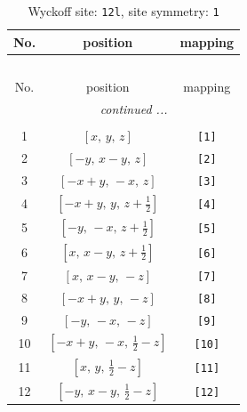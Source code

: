 \documentclass[fleqn,8pt]{jsarticle}
\begin{document}
\begin{longtable}{ccc}
\caption{Wyckoff site: {\tt 12l}, site symmetry: {\tt 1}}
 \\
 \hline \hline
No. & position & mapping \\ \hline \endfirsthead

\multicolumn{2}{l}{\tablename\ \thetable{}} \\
 \hline \hline
No. & position & mapping \\ \hline \endhead

 \hline \hline
\multicolumn{2}{r}{\footnotesize\it continued ...} \\ \endfoot

 \hline \hline
\multicolumn{2}{r}{} \\ \endlastfoot

1 & $\left[ x,\, y,\, z \right]$ & {\tt [1]} \\ \hline
2 & $\left[ - y,\, x - y,\, z \right]$ & {\tt [2]} \\ \hline
3 & $\left[ - x + y,\, - x,\, z \right]$ & {\tt [3]} \\ \hline
4 & $\left[ - x + y,\, y,\, z + \frac{1}{2} \right]$ & {\tt [4]} \\ \hline
5 & $\left[ - y,\, - x,\, z + \frac{1}{2} \right]$ & {\tt [5]} \\ \hline
6 & $\left[ x,\, x - y,\, z + \frac{1}{2} \right]$ & {\tt [6]} \\ \hline
7 & $\left[ x,\, x - y,\, - z \right]$ & {\tt [7]} \\ \hline
8 & $\left[ - x + y,\, y,\, - z \right]$ & {\tt [8]} \\ \hline
9 & $\left[ - y,\, - x,\, - z \right]$ & {\tt [9]} \\ \hline
10 & $\left[ - x + y,\, - x,\, \frac{1}{2} - z \right]$ & {\tt [10]} \\ \hline
11 & $\left[ x,\, y,\, \frac{1}{2} - z \right]$ & {\tt [11]} \\ \hline
12 & $\left[ - y,\, x - y,\, \frac{1}{2} - z \right]$ & {\tt [12]} \\
\end{longtable}
\end{document}
